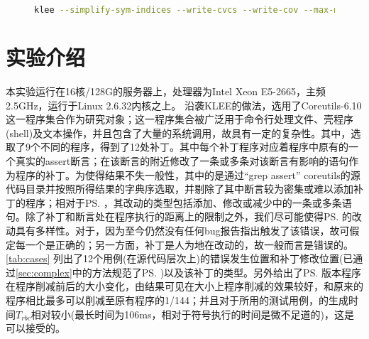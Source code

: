 \begin{itemize}
\begin{figure}[t]
  \begin{center}
    \begin{lstlisting}[language=bash]
klee --simplify-sym-indices --write-cvcs --write-cov --max-memory=1000 --disable-inlining --optimize --use-forked-stp --use-cex-cache --libc=uclibc --posix-runtime --allow-external-sym-calls --only-output-states-covering-new --max-instruction-time=30. --max-time=4800. --watchdog --max-memory-inhibit=false --max-static-fork-pct=1 --max-static-solve-pct=1 --max-static-cpfork-pct=1 --switch-type=internal --use-batching-search=0 -randomize-fork=0 --search=dfs klee-input.bc --sym-args 0 1 10 --sym-args 0 2 2 --sym-files 1 8 --sym-stdout
\end{lstlisting}
\vspace{-16pt}
\end{center}
\end{figure}
\end{itemize}

\section{实验介绍}
\label{sec:experiment}
本实验运行在16核/128G的服务器上，处理器为Intel Xeon E5-2665，主频2.5GHz，运行于Linux 2.6.32内核之上。
沿袭KLEE的做法，选用了Coreutils-6.10 这一程序集合作为研究对象；这一程序集合被广泛用于命令行处理文件、壳程序(shell)及文本操作，并且包含了大量的系统调用，故具有一定的复杂性。其中，选取了9个不同的程序，得到了12处补丁。其中每个补丁程序\patch 对应着程序中原有的一个真实的assert断言；在该断言的附近修改了一条或多条对该断言有影响的语句作为程序的补丁。为使得结果不失一般性，其中的\bug\ass 是通过“grep assert” coreutils的源代码目录并按照所得结果的字典序选取，并剔除了其中断言较为密集或难以添加补丁的程序；相对于\bug\ps ，其改动的类型包括添加、修改或减少\bug 中的一条或多条语句。除了补丁和断言处在程序执行的距离上的限制之外，我们尽可能使得\patch\ps 的改动具有多样性。对于\bug\ass ，因为至今仍然没有任何bug报告指出触发了该错误，故可假定每一个\bug\ass 是正确的；另一方面，补丁是人为地在\bug 改动的，故一般而言\patch 是错误的。
\autoref{tab:cases} 列出了12个用例(在源代码层次上)的错误发生位置和补丁修改位置(已通过\autoref{sec:complex}中的方法规范了\patch\ps )以及该补丁的类型。另外给出了\patch\ps 版本程序在程序削减前后的大小变化，由结果可见在大小上程序削减的效果较好，和原来的程序相比最多可以削减至原有程序的1/144；并且对于所用的测试用例，\rbscope 的生成时间$T_{rbc}$相对较小(最长时间为106ms，相对于符号执行的时间是微不足道的)，这是可以接受的。

